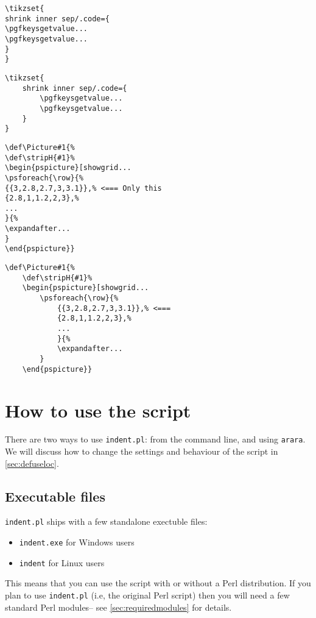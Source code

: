 \begin{adjustwidth}{-2cm}{2cm}
	\begin{minipage}{.5\textwidth}
		\begin{lstlisting}[style=demo,caption={\lstinline!tikzset! before}]
\tikzset{
shrink inner sep/.code={
\pgfkeysgetvalue...
\pgfkeysgetvalue...
}
}
		\end{lstlisting}
	\end{minipage}%
	\begin{minipage}{.5\textwidth}
		\begin{lstlisting}[style=demo,caption={\lstinline!tikzset! after}]
\tikzset{
	shrink inner sep/.code={
		\pgfkeysgetvalue...
		\pgfkeysgetvalue...
	}
}
		\end{lstlisting}
	\end{minipage}
	\begin{minipage}{.5\textwidth}
		\begin{lstlisting}[style=demo,caption={\lstinline!pstricks! before}]
\def\Picture#1{%
\def\stripH{#1}%
\begin{pspicture}[showgrid...
\psforeach{\row}{%
{{3,2.8,2.7,3,3.1}},% <=== Only this 
{2.8,1,1.2,2,3},%
...
}{%
\expandafter...
}
\end{pspicture}}
		\end{lstlisting}
	\end{minipage}%
	\begin{minipage}{.5\textwidth}
		\begin{lstlisting}[style=demo,caption={\lstinline!pstricks! after},label={lst:pstricksafter}]
\def\Picture#1{%
	\def\stripH{#1}%
	\begin{pspicture}[showgrid...
		\psforeach{\row}{%
			{{3,2.8,2.7,3,3.1}},% <=== 
			{2.8,1,1.2,2,3},%
            ...
			}{%
			\expandafter...
		}
	\end{pspicture}}
		\end{lstlisting}
	\end{minipage}
\end{adjustwidth}
     
\section{How to use the script}
There are two ways to use \lstinline!indent.pl!: from the command line, 
and using \lstinline!arara!.  We will discuss how to change the settings and behaviour 
of the script in \cref{sec:defuseloc}.

\subsection{Executable files}
\lstinline!indent.pl! ships with a few standalone exectuble files:
\begin{itemize}
	\item \lstinline!indent.exe! for Windows users
	\item \lstinline!indent! for Linux users
\end{itemize}
This means that you can use the script with or without a Perl distribution. If you 
plan to use \lstinline!indent.pl! (i.e, the original Perl script) then you will 
need a few standard Perl modules-- see \vref{sec:requiredmodules} for details.

